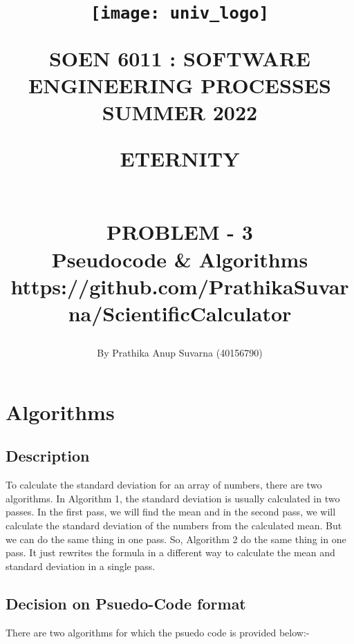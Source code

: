 \documentclass[11pt]{report}
\begin{document}
\title{\begin{figure}[htb]
\begin{center}
\texttt{[image: univ\_logo]}
\end{center}
\end{figure}SOEN 6011 : SOFTWARE ENGINEERING PROCESSES\\[.5em]
SUMMER 2022\\\vspace*{0.9in}
\begin{Large}
\textbf{ETERNITY} 
\end{Large}
\vspace*{0.5in}
\begin{Large}
\textbf{\\PROBLEM - 3} 
\\Pseudocode \& Algorithms\\
\small{https://github.com/PrathikaSuvarna/ScientificCalculator}
\end{Large}}
\author{By Prathika Anup Suvarna (40156790)}
\maketitle 
{}
\setcounter{page}{0}

\tableofcontents
\pagebreak

\renewcommand{\thesection}{\arabic{section}}


\section{\Large \vspace{0.2 cm}Algorithms}

\subsection{\Large \vspace{0.2 cm}Description}
To calculate the standard deviation for an array of numbers, there are two algorithms. In Algorithm 1, the standard deviation is usually calculated in two passes. In the first pass, we will find the mean and in the second pass, we will calculate the standard deviation of the numbers from the calculated mean. 
But we can do the same thing in one pass. So, Algorithm 2 do the same thing in one pass. It just rewrites the formula in a different way to calculate the mean and standard deviation in a single pass.

\subsection{\Large \vspace{0.2 cm}Decision on Psuedo-Code format}
There are two algorithms for which the psuedo code is provided below:-
\end{document}
